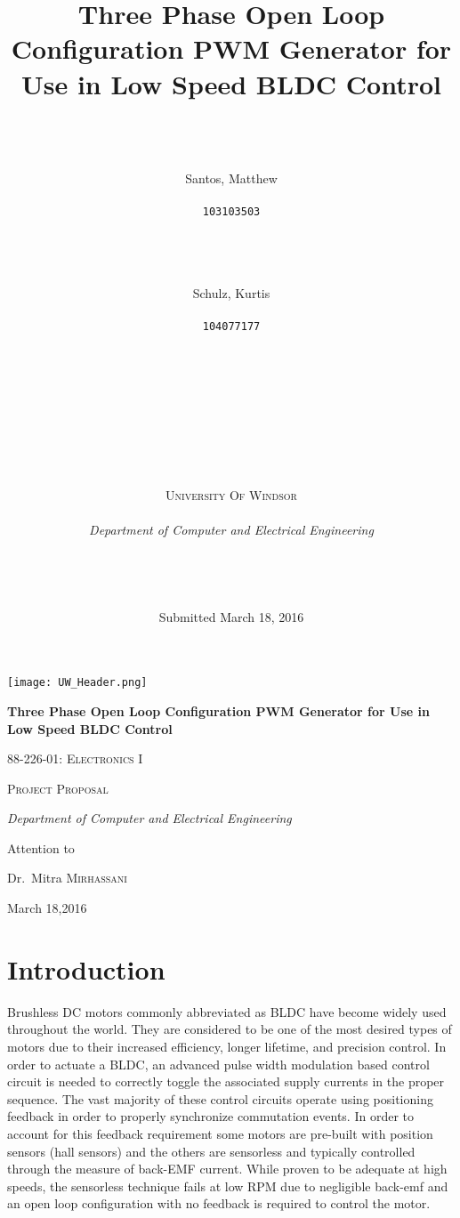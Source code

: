 \documentclass[12pt]{article}
\title{\huge\bfseries Three Phase Open Loop Configuration PWM Generator for Use in Low Speed BLDC Control
}
\author{
  \\
  \\
  \\
  \huge Santos, Matthew\\
  \\
  \texttt{\huge 103103503}
  \and
  \\
  \\
  \\
  \huge Schulz, Kurtis\\
  \\
  \texttt{\huge 104077177}
}
\date{\phantom\\
    \phantom\\
    \phantom\\
    \phantom\\
    \phantom\\
    \phantom\\
    \phantom\\
    \phantom\\
    {\scshape\Large University Of Windsor}\\
    \phantom\\
    {\Large\itshape Department of Computer and Electrical Engineering}\\
    \phantom\\
    \phantom\\
    \phantom\\
    \phantom\\
    Submitted March 18, 2016
}
\begin{document}
\begin{titlepage}
	\centering
	\texttt{[image: UW\_Header.png]}\par\vspace{1cm}

	{\huge\bfseries Three Phase Open Loop Configuration PWM Generator for Use in Low Speed BLDC Control\par}
	\vspace{1cm}
	{\scshape\Large 88-226-01: Electronics I\par}
	\vspace{1cm}
	{\scshape\Large Project Proposal \par}
	\vspace{1.5cm}

	\vspace{2cm}
	{\Large\itshape Department of Computer and Electrical Engineering\par}
	\vfill
	Attention to\par
	Dr.~Mitra \textsc{Mirhassani}

	\vfill

	{\large March 18,2016\par}
\end{titlepage}


\maketitle

\pagebreak
\tableofcontents
\pagebreak
\section{Introduction}%

Brushless DC motors commonly abbreviated as BLDC have become widely used throughout the world. They are considered to be one of the most desired types of motors due to their increased efficiency, longer lifetime, and precision control. %
In order to actuate a BLDC, an advanced pulse width modulation based control circuit is needed to correctly toggle the associated supply currents in the proper sequence. The vast majority of these control circuits operate using positioning feedback in order to properly synchronize commutation events. In order to account for this feedback requirement some motors are pre-built with position sensors (hall sensors) and the others are sensorless and typically controlled through the measure of back-EMF current. While proven to be adequate at high speeds, the sensorless technique fails at low RPM due to negligible back-emf and an open loop configuration with no feedback is required to control the motor.
\end{document}
